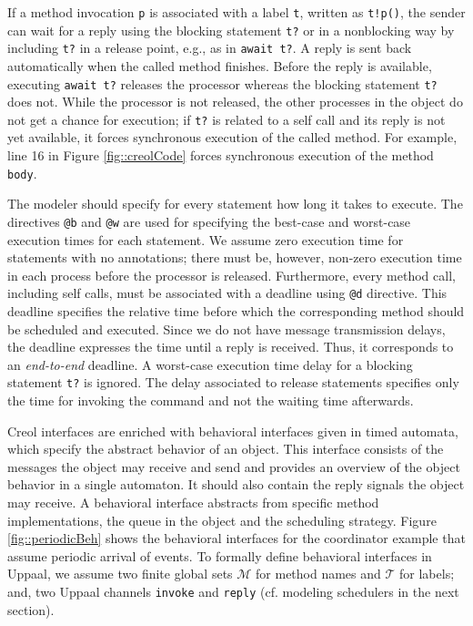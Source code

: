 \documentclass[copyright,creativecommons]{eptcs}
\theoremstyle{definition}
\renewcommand{\paragraph}[1]{\medskip \noindent {\bf #1}}
\newcommand{\M}{\mathcal{M}}
\newcommand{\Uppaal}{{\sc Uppaal}\xspace}
\begin{document}
If a method invocation \lstinline $p$ is associated with a label \lstinline $t$, written as \lstinline $t!p()$, the sender can wait for a reply using the blocking statement \lstinline $t?$ or in a nonblocking way by including \lstinline $t?$ in a release point, e.g., as in  \lstinline$await t?$.
A reply is sent back automatically when the called method finishes.
Before the reply is available, executing  \lstinline$await t?$ releases the processor whereas  the blocking statement \lstinline $t?$ does not. While the processor is not released, the other processes in the object do not get a chance for execution; if \lstinline$t?$ is related to a self call and its reply is not yet available, it forces synchronous execution of the called method.
For example, line 16 in Figure \ref{fig::creolCode} forces synchronous execution of the method \lstinline{body}.



\paragraph{Adding Real-Time}
The modeler should specify for every statement how long it takes to execute.
The directives \lstinline{@b} and \lstinline{@w} are used for specifying the best-case and worst-case execution times for each statement.
We assume zero execution time for statements with no annotations; there must be, however, non-zero execution time in each process before the processor is released.
Furthermore, every method call, including self calls, must be associated with a deadline using \lstinline{@d} directive. This deadline specifies the relative time before which the corresponding method should be scheduled and executed. Since we do not have message transmission delays, the deadline expresses the time until a reply is received. Thus, it corresponds to an {\em end-to-end} deadline.
A worst-case execution time delay for a blocking statement \lstinline$t?$ is ignored.
The delay associated to release statements specifies only the time for invoking the command and not the waiting time afterwards.








Creol interfaces are enriched with behavioral interfaces given in timed automata, which specify
the abstract behavior of an object. This interface consists of the messages the object may receive and send and provides an overview of the object behavior in a single automaton. It should also contain the reply signals the object may receive.
A behavioral interface abstracts from specific method implementations, the queue in the object and the scheduling strategy.
Figure \ref {fig::periodicBeh} shows the behavioral interfaces for the coordinator example that  assume  periodic arrival of events.
To formally define behavioral interfaces in \Uppaal, we assume two finite global sets $\M$ for method names and $\mathcal{T}$ for labels; and, two \Uppaal channels \lstinline{invoke} and \lstinline{reply} (cf. modeling schedulers in the next section).
\end{document}
